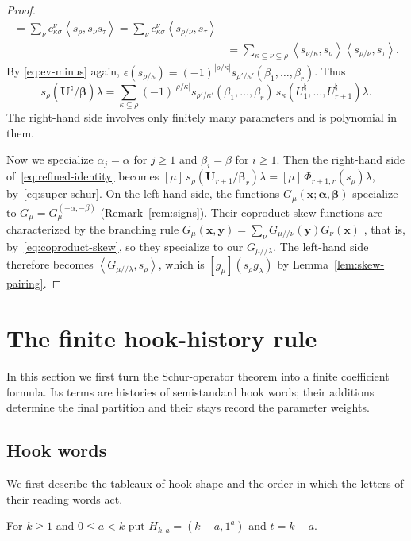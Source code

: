 \documentclass[11pt]{amsart}
\numberwithin{equation}{section}
\theoremstyle{definition}
\theoremstyle{remark}
\newcommand{\bfU}{\mathbf U}
\newcommand{\bbeta}{\boldsymbol\beta}
\newcommand{\balpha}{\boldsymbol\alpha}
\newcommand{\Hall}[2]{\left\langle #1,#2\right\rangle}
\newcommand{\sk}{/\!\!/}
\begin{document}
\begin{proof}
\begin{align*}
 =\sum_\nu c^\nu_{\kappa\sigma}\Hall{s_\rho}{s_\nu s_\tau}
 =\sum_\nu c^\nu_{\kappa\sigma}\Hall{s_{\rho/\nu}}{s_\tau}\\
 &=\sum_{\kappa\subseteq\nu\subseteq\rho}\Hall{s_{\nu/\kappa}}{s_\sigma}\Hall{s_{\rho/\nu}}{s_\tau}.
\end{align*}
By \eqref{eq:ev-minus} again,
$\epsilon(s_{\rho/\kappa})=(-1)^{|\rho/\kappa|}s_{\rho'/\kappa'}(\beta_1,\dots,\beta_r)$. Thus
\[
 s_\rho(\bfU^\natural/\bbeta)\lambda
 =\sum_{\kappa\subseteq\rho}(-1)^{|\rho/\kappa|}
 s_{\rho'/\kappa'}(\beta_1,\dots,\beta_r)\,
 s_\kappa(U^\natural_1,\dots,U^\natural_{r+1})\lambda.
\]
The right-hand side involves only finitely many parameters and is
polynomial in them.

Now we specialize $\alpha_j=\alpha$ for $j\geq1$ and
$\beta_i=\beta$ for $i\geq1$. Then the right-hand side of~\eqref{eq:refined-identity}
becomes $[\mu]\,s_\rho(\bfU_{r+1}/\bbeta_r)\lambda=[\mu]\,\Phi_{r+1,r}(s_\rho)\lambda$,
by~\eqref{eq:super-schur}. On the left-hand side, the functions
$G_\mu(\mathbf x;\balpha,\bbeta)$ specialize to $G_\mu=G^{(-\alpha,-\beta)}_\mu$
(Remark~\ref{rem:signs}). Their coproduct-skew functions are characterized
by the branching rule
$G_\mu(\mathbf x,\mathbf y)=\sum_\nu G_{\mu\sk\nu}(\mathbf y)G_\nu(\mathbf x)$
\cite[Prop.~2.3]{IMS25}, that is, by~\eqref{eq:coproduct-skew}, so they
specialize to our $G_{\mu\sk\lambda}$. The left-hand side therefore becomes
$\Hall{G_{\mu\sk\lambda}}{s_\rho}$, which is $[g_\mu](s_\rho g_\lambda)$ by
Lemma~\ref{lem:skew-pairing}.
\end{proof}

\section{The finite hook-history rule}\label{sec:finite}
In this section we first turn the Schur-operator theorem into a finite coefficient
formula. Its terms are histories of semistandard hook words; their
additions determine the final partition and their stays record the
parameter weights.

\subsection{Hook words}

We first describe the tableaux of hook shape and the order in which the
letters of their reading words act.

For $k\geq1$ and $0\leq a<k$ put $H_{k,a}=(k-a,1^a)$ and $t=k-a$.
\end{document}
